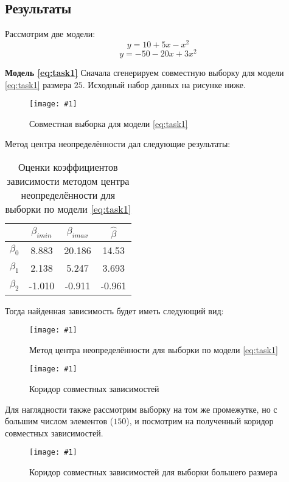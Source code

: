 \documentclass[a4paper,12pt]{article}
\newcommand{\plot}[3]{
    \begin{figure}[H]
        \texttt{[image: \#1]}
        \caption{#2}
        \label{#3}
    \end{figure}
}
\begin{document}
    \subsection{Результаты}
    Рассмотрим две модели:
    \begin{equation}
        y = 10 + 5x - x^{2}
        \label{eq:task1}
    \end{equation}
    \noindent
    \begin{equation}
        y = -50 - 20x + 3x^{2}
        \label{eq:task2}
    \end{equation}

    \noindent\textbf{Модель \ref{eq:task1}} \newline
    Сначала сгенерируем совместную выборку для модели \ref{eq:task1} размера $ 25 $. Исходный набор данных на рисунке ниже.
    \plot{ValidData25}{Совместная выборка для модели \ref{eq:task1}}{p:validdata25}
    
    \noindent Метод центра неопределённости дал следующие результаты:
    \begin{table}[H]
        \begin{center}
            \begin{tabular}{| c | c | c | c |}
                \hline
                & $ \beta_{imin} $ & $ \beta_{imax} $ & $ \hat{\beta} $ \\
                \hline
                $ \beta_{0} $ & 8.883 & 20.186 & 14.53 \\
                \hline
                $ \beta_{1} $ & 2.138 & 5.247 & 3.693 \\
                \hline
                $ \beta_{2} $ & -1.010 & -0.911 & -0.961 \\
                \hline
            \end{tabular}
        \end{center}
        \caption{Оценки коэффициентов зависимости методом центра неопределённости для выборки по модели \ref{eq:task1}}
        \label{t:validdata25}
    \end{table}

    \noindent Тогда найденная зависимость будет иметь следующий вид:
    \plot{UndefinedcenterValidData25}{Метод центра неопределённости для выборки по модели \ref{eq:task1}}{p:ucvaliddata25}
    \plot{CorridorUndefinedCenterValidData25}{Коридор совместных зависимостей}{p:corridorvaliddata25}

    \noindent Для наглядности также рассмотрим выборку на том же промежутке, но с большим числом элементов ($ 150 $), и посмотрим на полученный коридор совместных зависимостей.
    \plot{CorridorUndefinedCenterValidData150}{Коридор совместных зависимостей для выборки большего размера}{p:corridorvaliddata150}
\end{document}
